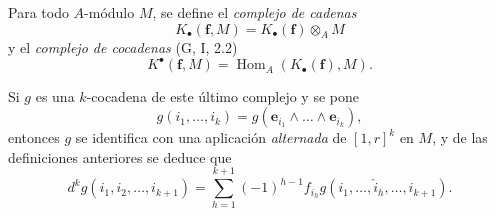 \begin{env}[1.1.2]
\label{III.1.1.2}
\label{III.1.1.2-fr}
Para todo $A$-módulo $M$, se define el \emph{complejo de cadenas}
\begin{equation}
\label{III.1.1.2.1-fr}
\tag{1.1.2.1}
K_\bullet(\mathbf f,M)=K_\bullet(\mathbf f)\otimes_A M
\end{equation}
y el \emph{complejo de cocadenas} (G, I, 2.2)
\begin{equation}
\label{III.1.1.2.2-fr}
\tag{1.1.2.2}
K^\bullet(\mathbf f,M)=\operatorname{Hom}_A(K_\bullet(\mathbf f),M).
\end{equation}

Si $g$ es una $k$-cocadena de este último complejo y se pone
\[
g(i_1,\ldots,i_k)=g(\mathbf e_{i_1}\wedge\ldots\wedge\mathbf e_{i_k}),
\]
entonces $g$ se identifica con una aplicación \emph{alternada} de $[1,r]^k$ en $M$, y de las definiciones anteriores se deduce que
\begin{equation}
\label{III.1.1.2.3-fr}
\tag{1.1.2.3}
d^kg(i_1,i_2,\ldots,i_{k+1})=
\sum_{h=1}^{k+1}(-1)^{h-1}f_{i_h}
g(i_1,\ldots,\widehat{i}_h,\ldots,i_{k+1}).
\end{equation}
\end{env}


